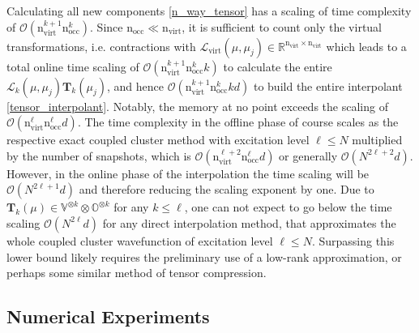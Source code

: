 \documentclass[reqno]{amsart}
\begin{document}
Calculating all new components \eqref{n_way_tensor} has a scaling of time complexity of $\mathcal{O}(\text{n}_{\text{virt}}^{k+1} \text{n}_\text{occ}^k)$. Since $ \text{n}_{\text{occ}} \ll \text{n}_{\text{virt}}$, it is sufficient to count only the virtual transformations, i.e. contractions with  $\mathscr{L}_{\text{virt}}(\mu,\mu_j)\in \mathbb{R}^{\text{n}_\text{virt}\times \text{n}_\text{virt}}$ which leads to a total online time scaling of $\mathcal{O}(\text{n}_{\text{virt}}^{k+1} \text{n}_\text{occ}^{k}k)$ to calculate the entire $\mathscr{L}_k(\mu,\mu_j)\mathbf{T}_k(\mu_j)$, and hence $\mathcal{O}(\text{n}_{\text{virt}}^{k+1} \text{n}_\text{occ}^{k} kd  )$ to build the entire interpolant \eqref{tensor_interpolant}. Notably, the memory at no point exceeds the scaling of $\mathcal{O}( \text{n}_{\text{virt}}^\ell \text{n}_\text{occ}^\ell d )$. The time complexity in the offline phase of course scales as the respective exact coupled cluster method with excitation level $\ell \le N$ multiplied by the number of snapshots, which is $\mathcal{O}(\text{n}_{\text{virt}}^{\ell+2}\text{n}^\ell_\text{occ}d)$ or generally $\mathcal{O}(N^{2\ell+2}d)$. However, in the online phase of the interpolation the time scaling will be $\mathcal{O}(N^{2\ell+1}d)$ and therefore reducing the scaling exponent by one. Due to $\mathbf{T}_k(\mu)\in \mathbb{V}^{\otimes k}\otimes \mathbb{O}^{\otimes k}$ for any $k\le \ell $, one can not expect to go below the time scaling $\mathcal{O}(N^{2\ell}d)$ for any direct interpolation method, that approximates the whole coupled cluster wavefunction of excitation level $\ell\le N$. Surpassing this lower bound likely requires the preliminary use of a low-rank approximation, or perhaps some similar method of tensor compression.


\subsection{Numerical Experiments}\label{NumExp}
\end{document}
